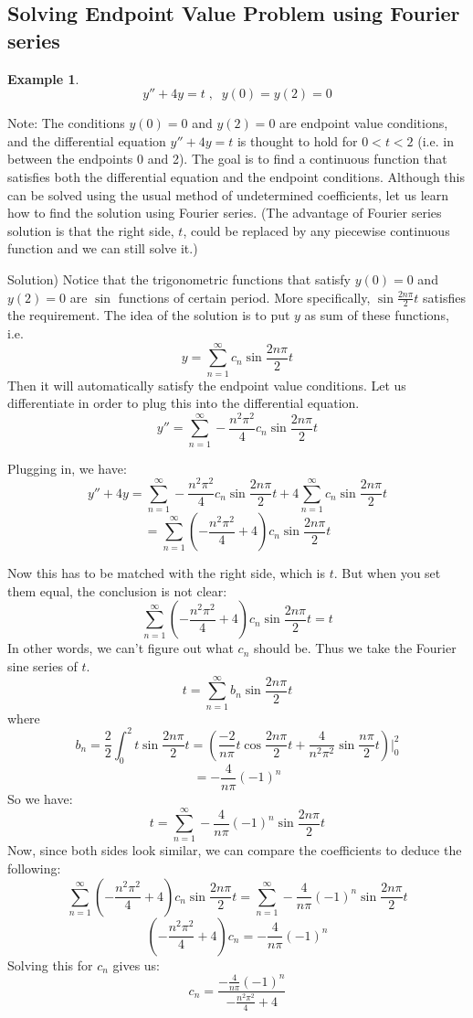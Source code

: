 \documentclass[12pt]{report}
\newtheorem{ex}{Example}[section]
\begin{document}
\subsection*{Solving Endpoint Value Problem using Fourier series }

\begin{ex}
$$y''+4y =t  \; , \; \; y(0)=y(2)=0$$
\end{ex}
Note: The conditions $y(0)=0$ and $y(2)=0$ are endpoint value conditions, and the differential equation $y''+4y =t$ is thought to hold for $0<t<2$ (i.e. in between the endpoints 0 and 2). The goal is to find a continuous function that satisfies both the differential equation and the endpoint conditions. Although this can be solved using the usual method of undetermined coefficients, let us learn how to find the solution using Fourier series. (The advantage of Fourier series solution is that the right side, $t$, could be replaced by any piecewise continuous function and we can still solve it.)

Solution) Notice that the trigonometric functions that satisfy $y(0)=0$ and $y(2)=0$ are $\sin$ functions of certain period. More specifically, $\sin \frac{2n\pi}{2} t $ satisfies the requirement. The idea of the solution is to put $y$ as sum of these functions, i.e.
$$y = \sum_{n=1}^{\infty} c_n \sin \frac{2n\pi}{2} t$$
Then it will automatically satisfy the endpoint value conditions. Let us differentiate in order to plug this into the differential equation.
$$y'' = \sum_{n=1}^{\infty} -\frac{n^2\pi^2}{4} c_n \sin \frac{2n\pi}{2} t$$

Plugging in, we have:
$$y''+ 4y = \sum_{n=1}^{\infty} -\frac{n^2\pi^2}{4} c_n \sin \frac{2n\pi}{2} t + 4\sum_{n=1}^{\infty}  c_n \sin \frac{2n\pi}{2} t $$
$$ = \sum_{n=1}^{\infty} \left(-\frac{n^2\pi^2}{4}+4 \right) c_n \sin \frac{2n\pi}{2} t $$

Now this has to be matched with the right side, which is $t$. But when you set them equal, the conclusion is not clear:
$$\sum_{n=1}^{\infty} \left(-\frac{n^2\pi^2}{4}+4 \right) c_n \sin \frac{2n\pi}{2} t =t$$
In other words, we can't figure out what $c_n$ should be. Thus we take the Fourier sine series of $t$.
$$ t = \sum_{n=1}^{\infty} b_n \sin \frac{2n\pi}{2} t$$
where
$$b_n = \frac{2}{2} \int_0^2 t \sin \frac{2n\pi}{2} t = \left( \frac{-2}{n\pi} t \cos \frac{2n\pi}{2} t + \frac{4}{n^2\pi^2} \sin  \frac{n\pi}{2} t \right) \Bigg\vert_0^2 $$
$$ = -\frac{4}{n\pi} (-1)^n$$
So we have:
$$ t = \sum_{n=1}^{\infty} -\frac{4}{n\pi} (-1)^n \sin \frac{2n\pi}{2} t$$
Now, since both sides look similar, we can compare the coefficients to deduce the following:
$$\sum_{n=1}^{\infty} \left(-\frac{n^2\pi^2}{4}+4 \right) c_n \sin \frac{2n\pi}{2} t =\sum_{n=1}^{\infty} -\frac{4}{n\pi} (-1)^n \sin \frac{2n\pi}{2} t$$
$$\left(-\frac{n^2\pi^2}{4}+4 \right) c_n = -\frac{4}{n\pi} (-1)^n$$
Solving this for $c_n$ gives us:
$$c_n = \frac{-\frac{4}{n\pi} (-1)^n}{-\frac{n^2\pi^2}{4}+4} $$
\end{document}
